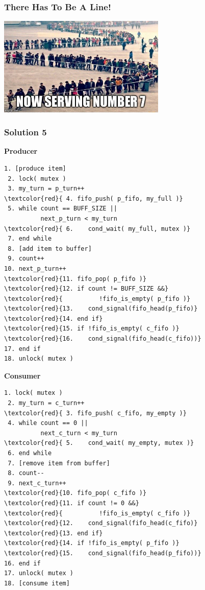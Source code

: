 \begin{frame}
	\frametitle{There Has To Be A Line!}

	\begin{center}
		\includegraphics[width=0.6\textwidth]{images/now_serving2}
	\end{center}
\end{frame}

\begin{frame}[fragile]
	\frametitle{Solution 5}

	\begin{multicols}{2}
		\footnotesize
		\textbf{Producer}
		\begin{Verbatim}[commandchars=\\\{\}]
 1. [produce item]
 2. lock( mutex )
 3. my_turn = p_turn++
\textcolor{red}{ 4. fifo_push( p_fifo, my_full )}
 5. while count == BUFF_SIZE ||
          next_p_turn < my_turn
\textcolor{red}{ 6.    cond_wait( my_full, mutex )}
 7. end while
 8. [add item to buffer]
 9. count++
10. next_p_turn++
\textcolor{red}{11. fifo_pop( p_fifo )}
\textcolor{red}{12. if count != BUFF_SIZE &&}
\textcolor{red}{          !fifo_is_empty( p_fifo )}
\textcolor{red}{13.    cond_signal(fifo_head(p_fifo)}
\textcolor{red}{14. end if}
\textcolor{red}{15. if !fifo_is_empty( c_fifo )}
\textcolor{red}{16.    cond_signal(fifo_head(c_fifo))}
17. end if
18. unlock( mutex )
		\end{Verbatim}
		\columnbreak
		\textbf{Consumer}\vspace{-2em}
		\begin{Verbatim}[commandchars=\\\{\}]
 1. lock( mutex )
 2. my_turn = c_turn++
\textcolor{red}{ 3. fifo_push( c_fifo, my_empty )}
 4. while count == 0 ||
          next_c_turn < my_turn
\textcolor{red}{ 5.    cond_wait( my_empty, mutex )}
 6. end while
 7. [remove item from buffer]
 8. count--
 9. next_c_turn++
\textcolor{red}{10. fifo_pop( c_fifo )}
\textcolor{red}{11. if count != 0 &&}
\textcolor{red}{          !fifo_is_empty( c_fifo )}
\textcolor{red}{12.    cond_signal(fifo_head(c_fifo)}
\textcolor{red}{13. end if}
\textcolor{red}{14. if !fifo_is_empty( p_fifo )}
\textcolor{red}{15.    cond_signal(fifo_head(p_fifo))}
16. end if
17. unlock( mutex )
18. [consume item]
		\end{Verbatim}
	\end{multicols}
\end{frame}



